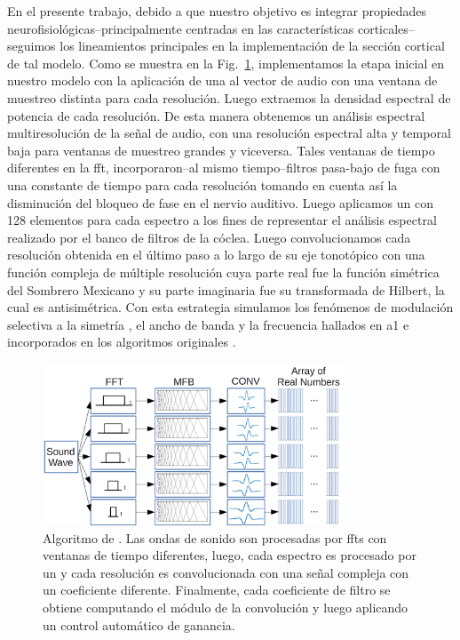 {En el presente trabajo, debido a que nuestro objetivo es integrar propiedades neurofisiológicas--principalmente centradas en las características corticales--seguimos
los lineamientos principales en la implementación de la sección cortical de tal modelo.
Como se muestra en la Fig.~\ref{fig:MRSTSA}, implementamos la etapa inicial en nuestro modelo con la aplicación de una  al vector de audio
con una ventana de muestreo distinta para cada resolución.
Luego extraemos la densidad espectral de potencia de cada resolución.
De esta manera obtenemos un análisis espectral multiresolución de la señal de audio,
con una resolución espectral alta y temporal baja para ventanas de muestreo grandes y
viceversa.
Tales ventanas de tiempo diferentes en la \gls{fft},
incorporaron--al mismo tiempo--filtros pasa-bajo de fuga con una constante de tiempo para cada
resolución tomando en cuenta así la disminución del bloqueo de fase en el nervio auditivo. 
Luego aplicamos un  con 128 elementos para cada espectro
a los fines de representar el análisis espectral realizado por el banco de filtros de la cóclea.
Luego convolucionamos cada resolución obtenida en el último paso a lo largo de su eje tonotópico
con una función compleja de múltiple resolución cuya parte real
fue la función simétrica del Sombrero Mexicano y su parte imaginaria fue su transformada de Hilbert, la cual es antisimétrica.
Con esta estrategia simulamos los fenómenos de modulación selectiva a la simetría \cite{shamma_1993}, el ancho de banda \cite{schreiner_1990}
y la frecuencia \cite{shamma_1993,heil_1992,mendelson_1985}
hallados en \gls{a1} e incorporados en los algoritmos originales \cite{wang_1995}.

\begin{figure}[h!]
    \centering
    \includegraphics[width=0.8\textwidth]{MRSTSA.png}
    \caption{Algoritmo de . Las ondas de sonido son procesadas por \glspl{fft} con ventanas de tiempo diferentes, luego, cada espectro es procesado por
	    un  y cada resolución es convolucionada con una señal compleja con un coeficiente diferente. Finalmente, cada coeficiente de filtro
	    se obtiene computando el módulo de la convolución y luego aplicando un control automático de ganancia.}
    \label{fig:MRSTSA}
\end{figure}

}
